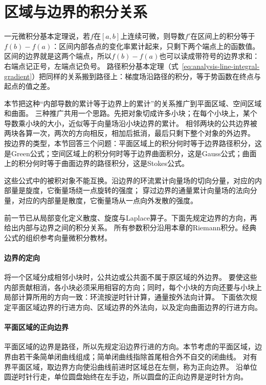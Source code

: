 \section{区域与边界的积分关系}
\label{sec:multivariable-boundary-relations}

一元微积分基本定理说，若$f$在$[a,b]$上连续可微，则导数$f'$在区间上的积分等于$f(b)-f(a)$：区间内部各点的变化率累计起来，只剩下两个端点上的函数值。
区间的边界就是这两个端点，所以$f(b)-f(a)$也可以读成带符号的边界求和：右端点记正号，左端点记负号。
路径积分基本定理（式~\eqref{eq:analysis-line-integral-gradient}）把同样的关系搬到路径上：梯度场沿路径的积分，等于势函数在终点与起点的值之差。

本节把这种“内部导数的累计等于边界上的累计”的关系推广到平面区域、空间区域和曲面。
三种推广共用一个思路。先把对象切成许多小块；在每个小块上，某个导数乘小块的大小，近似等于向量场沿小块边界的累计。
相邻两块的公共边界被两块各算一次，两次的方向相反，相加后抵消，最后只剩下整个对象的外边界。
按边界的类型，本节回答三个问题：平面区域上的积分何时等于边界路径积分，这是Green公式；空间区域上的积分何时等于边界曲面积分，这是Gauss公式；曲面上的积分何时等于曲面边界的路径积分，这是Stokes公式。

这些公式中的被积对象不能互换。沿边界的环流累计向量场的切向分量，对应的内部量是旋度，它衡量场绕一点旋转的强度；
穿过边界的通量累计向量场的法向分量，对应的内部量是散度，它衡量场从一点向外发散的强度。

前一节已从局部变化定义散度、旋度与Laplace算子。下面先规定边界的方向，再给出内部与边界之间的积分关系。
所有参数积分沿用本章的Riemann积分。经典公式的组织参考向量微积分教材。

\paragraph{边界的定向}

将一个区域分成相邻小块时，公共边或公共面不属于原区域的外边界。
要使这些内部贡献相消，各小块必须采用相容的方向；同时，每个小块的方向还要与小块上局部计算所用的方向一致：环流按逆时针计算，通量按外法向计算。
下面依次规定平面区域边界的行进方向、区域边界的外法向，以及定向曲面边界的行进方向。

\paragraph{平面区域的正向边界}

平面区域的边界是路径，所以先规定沿边界行进的方向。本节考虑的平面区域，边界由若干条简单闭曲线组成；简单闭曲线指除首尾相合外不自交的闭曲线。
对有界平面区域，取边界方向使沿曲线前进时区域总在左侧，称为正向边界。
沿单位圆逆时针行走，单位圆盘始终在左手边，所以圆盘的正向边界是逆时针方向。

